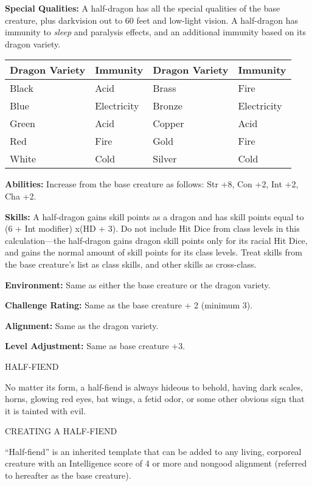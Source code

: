 \documentclass{article}
\begin{document}
\textbf{Special Qualities:} A half-dragon has all the special qualities of the 
base creature, plus darkvision out to 60 feet and low-light vision. A half-dragon 
has immunity to \textit{sleep }and paralysis effects, and an additional immunity 
based on its dragon variety.

\begin{tabular}{|>{\raggedright}p{65pt}|>{\raggedright}p{41pt}|>{\raggedright}p{65pt}|>{\raggedright}p{41pt}|}
\hline
D\textbf{ragon Variety} & I\textbf{mmunity} & D\textbf{ragon Variety} & I\textbf{mmunity}\tabularnewline
\hline
Black & Acid & Brass & Fire\tabularnewline
\hline
Blue & Electricity & Bronze & Electricity\tabularnewline
\hline
Green & Acid & Copper & Acid\tabularnewline
\hline
Red & Fire & Gold & Fire\tabularnewline
\hline
White & Cold & Silver & Cold\tabularnewline
\hline
\end{tabular}

\textbf{Abilities:} Increase from the base creature as follows: Str +8, Con +2, 
Int +2, Cha +2.

\textbf{Skills:} A half-dragon gains skill points as a dragon and has skill points 
equal to (6 + Int modifier) x$ $(HD + 3). Do not include Hit Dice from class levels 
in this calculation---the half-dragon gains dragon skill points only for its racial 
Hit Dice, and gains the normal amount of skill points for its class levels. Treat 
skills from the base creature's list as class skills, and other skills as cross-class.

\textbf{Environment:} Same as either the base creature or the dragon variety.

\textbf{Challenge Rating:} Same as the base creature + 2 (minimum 3).

\textbf{Alignment:} Same as the dragon variety.

\textbf{Level Adjustment:} Same as base creature +3.

\vspace{12pt}
{\LARGE{}HALF-FIEND}

No matter its form, a half-fiend is always hideous to behold, having dark scales, 
horns, glowing red eyes, bat wings, a fetid odor, or some other obvious sign that 
it is tainted with evil.

CREATING A HALF-FIEND

``Half-fiend'' is an inherited template that can be added to any living, corporeal 
creature with an Intelligence score of 4 or more and nongood alignment (referred 
to hereafter as the base creature).
\end{document}
